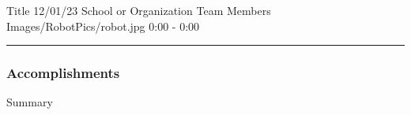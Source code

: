 \insertmeeting
	{Title} 
	{12/01/23} 
	{School or Organization}
	{Team Members}
	{Images/RobotPics/robot.jpg}
	{0:00 - 0:00}

 

\noindent\hfil\rule{\textwidth}{.4pt}\hfil

\subsubsection*{Accomplishments}
Summary

